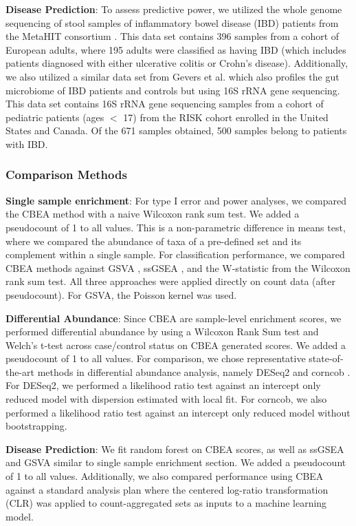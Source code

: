\documentclass[10pt,letterpaper]{article}
\begin{document}
\noindent \textbf{Disease Prediction}: To assess predictive power, we utilized the whole genome sequencing of stool samples of inflammatory bowel disease (IBD) patients from the MetaHIT consortium \cite{nielsen2014}. This data set contains 396 samples from a cohort of European adults, where 195 adults were classified as having IBD (which includes patients diagnosed with either ulcerative colitis or Crohn's disease). Additionally, we also utilized a similar data set from Gevers et al. \cite{gevers2014} which also profiles the gut microbiome of IBD patients and controls but using 16S rRNA gene sequencing. This data set contains 16S rRNA gene sequencing samples from a cohort of pediatric patients (ages $<$ 17) from the RISK cohort enrolled in the United States and Canada. Of the 671 samples obtained, 500 samples belong to patients with IBD. 

\subsubsection*{Comparison Methods}

\noindent \textbf{Single sample enrichment}: For type I error and power analyses, we compared the CBEA method with a naive Wilcoxon rank sum test. We added a pseudocount of 1 to all values. This is a non-parametric difference in means test, where we compared the abundance of taxa of a pre-defined set and its complement within a single sample. For classification performance, we compared CBEA methods against GSVA \cite{hanzelmann2013}, ssGSEA \cite{barbie2009}, and the W-statistic from the Wilcoxon rank sum test. All three approaches were applied directly on count data (after pseudocount). For GSVA, the Poisson kernel was used. 

\noindent \textbf{Differential Abundance}: Since CBEA are sample-level enrichment scores, we performed differential abundance by using a Wilcoxon Rank Sum test and Welch's t-test across case/control status on CBEA generated scores. We added a pseudocount of 1 to all values. For comparison, we chose representative state-of-the-art methods in differential abundance analysis, namely DESeq2 \cite{love2014,mcmurdie2014} and corncob \cite{martin2020}. For DESeq2, we performed a likelihood ratio test against an intercept only reduced model with dispersion estimated with local fit. For corncob, we also performed a likelihood ratio test against an intercept only reduced model without bootstrapping. 

\noindent \textbf{Disease Prediction}: We fit random forest on CBEA scores, as well as ssGSEA \cite{hanzelmann2013} and GSVA \cite{barbie2009} similar to single sample enrichment section. We added a pseudocount of 1 to all values. Additionally, we also compared performance using CBEA against a standard analysis plan where the centered log-ratio transformation (CLR) was applied to count-aggregated sets as inputs to a machine learning model. 
\end{document}
